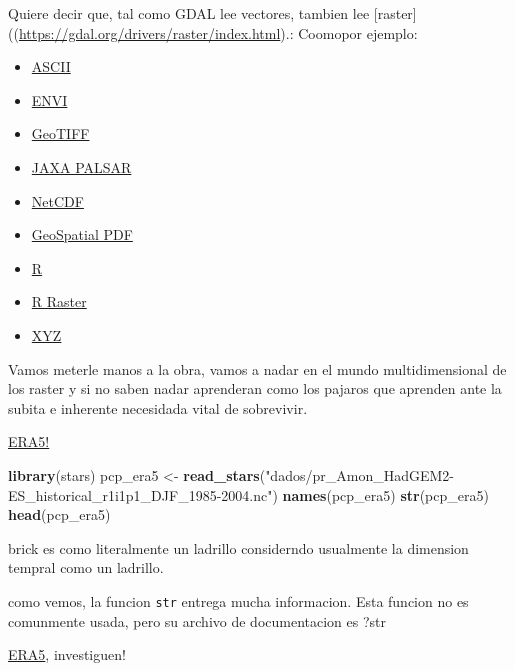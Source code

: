 \documentclass[]{book}
\newenvironment{Shaded}{\begin{snugshade}}{\end{snugshade}}
\newcommand{\KeywordTok}[1]{\textcolor[rgb]{0.13,0.29,0.53}{\textbf{#1}}}
\newcommand{\NormalTok}[1]{#1}
\newcommand{\StringTok}[1]{\textcolor[rgb]{0.31,0.60,0.02}{#1}}
\providecommand{\tightlist}{%
  \setlength{\itemsep}{0pt}\setlength{\parskip}{0pt}}
\begin{document}
Quiere decir que, tal como GDAL lee vectores, tambien lee {[}raster{]}((\url{https://gdal.org/drivers/raster/index.html}).: Coomopor ejemplo:

\begin{itemize}
\tightlist
\item
  \href{https://gdal.org/drivers/raster/aaigrid.html}{ASCII}
\item
  \href{https://gdal.org/drivers/raster/envi.html}{ENVI}
\item
  \href{https://gdal.org/drivers/raster/gtiff.html}{GeoTIFF}
\item
  \href{https://gdal.org/drivers/raster/palsar.html}{JAXA PALSAR}
\item
  \href{https://gdal.org/drivers/raster/netcdf.html}{NetCDF}
\item
  \href{https://gdal.org/drivers/raster/pdf.html}{GeoSpatial PDF}
\item
  \href{https://gdal.org/drivers/raster/r.html}{R}
\item
  \href{https://gdal.org/drivers/raster/rraster.html}{R Raster}
\item
  \href{https://gdal.org/drivers/raster/xyz.html}{XYZ}
\end{itemize}

Vamos meterle manos a la obra, vamos a nadar en el mundo multidimensional de los raster y si no saben nadar aprenderan como los pajaros que aprenden ante la subita e inherente necesidada vital de sobrevivir.

\href{https://www.ecmwf.int/en/forecasts/datasets/reanalysis-datasets/era5}{ERA5!}

\begin{Shaded}
\begin{Highlighting}[]
\KeywordTok{library}\NormalTok{(stars)}
\NormalTok{pcp_era5 <-}\StringTok{ }\KeywordTok{read_stars}\NormalTok{(}\StringTok{"dados/pr_Amon_HadGEM2-ES_historical_r1i1p1_DJF_1985-2004.nc"}\NormalTok{)}
\KeywordTok{names}\NormalTok{(pcp_era5)}
\KeywordTok{str}\NormalTok{(pcp_era5)}
\KeywordTok{head}\NormalTok{(pcp_era5)}
\end{Highlighting}
\end{Shaded}

brick es como literalmente un ladrillo considerndo usualmente la dimension tempral como un ladrillo.

como vemos, la funcion \texttt{str} entrega mucha informacion. Esta funcion no es comunmente usada, pero su archivo de documentacion es ?str

\href{https://www.ecmwf.int/en/forecasts/datasets/reanalysis-datasets/era5}{ERA5}, investiguen!
\end{document}
